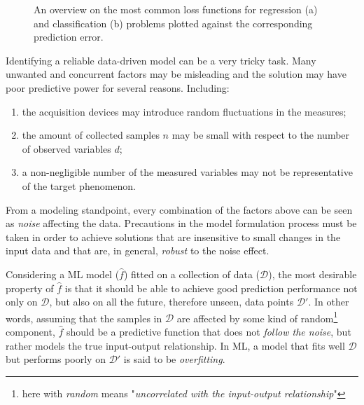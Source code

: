 	  \begin{figure}[!h]
	  	\centering
	  	\caption{An overview on the most common loss functions for regression (a) and classification (b) problems plotted against the corresponding prediction error.}\label{fig:loss}
	  \end{figure}

	  Identifying a reliable data-driven model can be a very tricky task. Many unwanted and concurrent factors may be misleading and the solution may have poor predictive power for several reasons.
		Including:
		\begin{enumerate}
			\item the acquisition devices may introduce random fluctuations in the measures;
			\item the amount of collected samples $n$ may be small with respect to the number of observed variables $d$;
			\item a non-negligible number of the measured variables may not be representative of the target phenomenon.
	  \end{enumerate}
		From a modeling standpoint, every combination of the factors above can be seen as \textit{noise} affecting the data.
		Precautions in the model formulation process must be taken in order to achieve solutions that are insensitive to small changes in the input data and that are, in general, \textit{robust} to the noise effect.

		Considering a ML model ($\hat f$) fitted on a collection of data ($\mathcal{D}$), the most desirable property of $\hat f$ is that it should be able to achieve good prediction performance not only on $\mathcal{D}$, but also on all the future, therefore unseen, data points $\mathcal{D}'$.
		In other words, assuming that the samples in $\mathcal{D}$ are affected by some kind of random\footnote{here with \textit{random} means "\textit{uncorrelated with the input-output relationship}"} component, $\hat f$ should be a predictive function that does not \textit{follow the noise}, but rather models the true input-output relationship.
		In ML, a model that fits well $\mathcal{D}$ but performs poorly on $\mathcal{D}'$ is said to be \textit{overfitting}.

